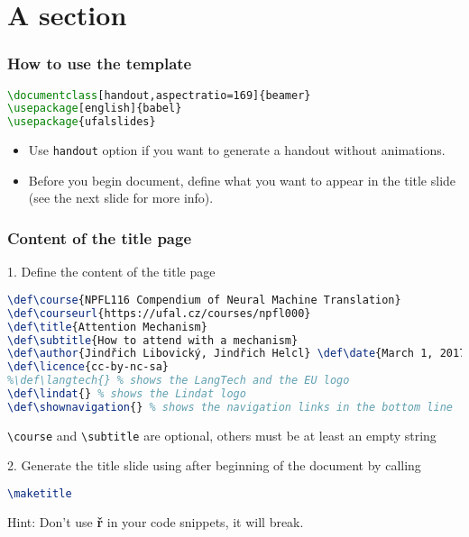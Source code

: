 \documentclass[handout,aspectratio=169]{beamer}
\def\course{NPFL000 Name of the course}
\def\courseurl{https://ufal.cz/courses/npfl000}
\def\title{\LaTeX~template for LangTech courses taught at ÚFAL}
\def\author{Jindřich Libovický}
\def\date{September 7, 2018}
\def\licence{cc-by-nc-sa}
\def\langtech{}
\def\shownavigation{}
\begin{document}
\maketitle


\section{A section}

\begin{frame}[fragile]
    \frametitle{How to use the template}

    \begin{lstlisting}[language=TeX]
\documentclass[handout,aspectratio=169]{beamer}
\usepackage[english]{babel}
\usepackage{ufalslides}
\end{lstlisting}

    \begin{itemize}
        \item Use \lstinline{handout} option if you want to generate a handout without
    animations.

        \item Before you begin document, define what you want to
            appear in the title slide (see the next slide for more info).
    \end{itemize}

\end{frame}


\begin{frame}[fragile]
    \frametitle{Content of the title page}

1. Define the content of the title page
    \begin{lstlisting}[language=TeX]
\def\course{NPFL116 Compendium of Neural Machine Translation}
\def\courseurl{https://ufal.cz/courses/npfl000}
\def\title{Attention Mechanism}
\def\subtitle{How to attend with a mechanism}
\def\author{Jindřich Libovický, Jindřich Helcl} \def\date{March 1, 2017}
\def\licence{cc-by-nc-sa}
%\def\langtech{} % shows the LangTech and the EU logo
\def\lindat{} % shows the Lindat logo
\def\shownavigation{} % shows the navigation links in the bottom line
\end{lstlisting}

    {\tt  \textbackslash course} and {\tt  \textbackslash subtitle} are optional, others must be at least
    an empty string

2. Generate the title slide using after beginning of the document by calling
\begin{lstlisting}[language=TeX]
\maketitle
\end{lstlisting}

    \vspace{5pt}

    Hint: Don't use \textbf{ř} in your code snippets, it will break.

\end{frame}
\end{document}
